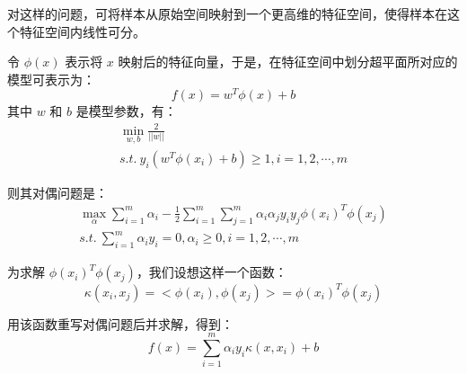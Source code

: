 \documentclass[12pt, a4paper]{article} %
\begin{document}
对这样的问题，可将样本从原始空间映射到一个更高维的特征空间，使得样本在这个特征空间内线性可分。

令 $\phi (x)$ 表示将 $x$ 映射后的特征向量，于是，在特征空间中划分超平面所对应的模型可表示为：
\begin{equation*}
    f(x) = w^T \phi(x) + b
\end{equation*}
其中 $w$ 和 $b$ 是模型参数，有：
\begin{equation*}
    \begin{array}{*{20}{l}}
        \displaystyle \min_{w, b} \frac{2}{||w||}\\
        \displaystyle s.t. \ y_i(w^T \phi(x_i) + b) \ge 1, i = 1, 2, \cdots, m
    \end{array}
\end{equation*}

则其对偶问题是：
\begin{equation*}
    \begin{array}{*{20}{l}}
        \displaystyle \max_{\alpha} \sum_{i = 1}^{m} \alpha_i - \frac{1}{2} \sum_{i = 1}^{m} \sum_{j = 1}^{m} \alpha_i \alpha_j y_i y_j \phi(x_i) ^T \phi(x_j)\\
        \displaystyle s.t. \ \sum_{i = 1}^{m} \alpha_i y_i = 0, \alpha_i \ge 0, i = 1, 2, \cdots, m
    \end{array}
\end{equation*}

为求解 $\phi(x_i) ^T \phi(x_j)$，我们设想这样一个函数：
\begin{equation*}
    \kappa (x_i, x_j) = <\phi(x_i), \phi(x_j)> = \phi(x_i) ^T \phi(x_j)
\end{equation*}

用该函数重写对偶问题后并求解，得到：
\begin{equation*}
    f(x) = \sum_{i = 1}^{m} \alpha_i y_i \kappa(x, x_i) + b
\end{equation*}
\end{document}
